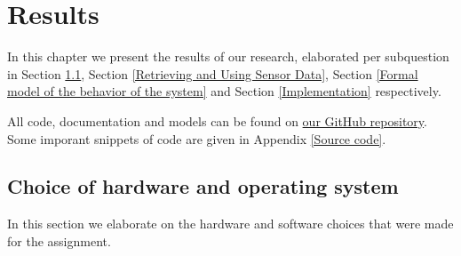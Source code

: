 \documentclass[12pt]{scrreprt}
\begin{document}
\chapter{Results}
\label{Results}
In this chapter we present the results of our research, elaborated per subquestion in Section \ref{Choice of hardware and software}, Section \ref{Retrieving and Using Sensor Data}, Section \ref{Formal model of the behavior of the system} and Section \ref{Implementation} respectively.
\par
All code, documentation and models can be found on \href{https://github.com/Yousousen/safety-module-for-care-robot-rose.git}{our GitHub repository}. Some imporant snippets of code are given in Appendix \ref{Source code}.

\section{Choice of hardware and operating system}
\label{Choice of hardware and software}
In this section we elaborate on the hardware and software choices that were made for the assignment.
\end{document}
